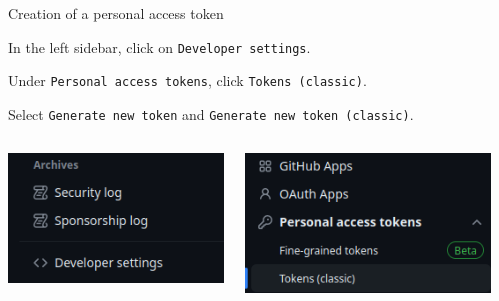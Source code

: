 \documentclass[10pt]{beamer}
\begin{document}
\begin{frame}[fragile]{Creation of a personal access token}
\protect\hypertarget{creation-of-a-personal-access-token-1}{}

In the left sidebar, click on \texttt{Developer\ settings}.

Under \texttt{Personal\ access\ tokens}, click
\texttt{Tokens\ (classic)}.

Select \texttt{Generate\ new\ token} and
\texttt{Generate\ new\ token\ (classic)}.

\begin{columns}
\begin{column}{0.3\textwidth}  
    \begin{center}
     \includegraphics[width=\textwidth]{img/access-token-4.png}
     \end{center}
\end{column}
\begin{column}{0.3\textwidth}  
    \begin{center}
     \includegraphics[width=\textwidth]{img/access-token-1.png}
     \end{center}
\end{column}
\begin{column}{0.3\textwidth}  
    \begin{center}


\end{center}
\end{column}
\end{columns}
\end{frame}
\end{document}
